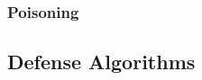 \documentclass[11pt]{article}
\begin{document}
\subsubsection{Poisoning}
\subsection{Defense Algorithms}




% 
% 
\end{document}
